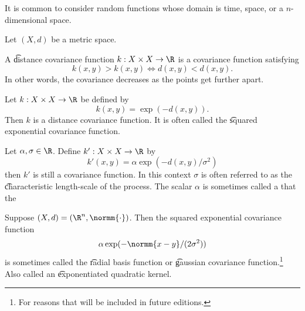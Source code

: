 

It is common to consider random functions whose domain is time, space, or a $n$-dimensional space.


Let $(X, d)$ be a metric space.

A \t{distance covariance function} $k: X \times X \to \R$ is a covariance function satisfying
\[
  k(x, y) > k(x, y) \iff d(x, y) < d(x, y).
\]
In other words, the covariance decreases as the points get further apart.


Let $k: X \times X \to \R$ be defined by
\[
  k(x, y) = \exp(-d(x, y)).
\]
Then $k$ is a distance covariance function.
It is often called the \t{squared exponential covariance function}.

Let $\alpha, \sigma \in \R$.
Define $k': X \times X \to \R$ by
\[
  k'(x, y) = \alpha\exp(-d(x, y)/\sigma^2)
\]
then $k'$ is still a covariance function.
In this context $\sigma$ is often referred to as the \t{characteristic length-scale} of the process.
The scalar $\alpha$ is sometimes called a  that  the 

Suppose $(X, d) = (\R^n, \normm{\cdot})$.
Then the squared exponential covariance function
\[
 \alpha\exp(-\normm{x - y}/(2\sigma^2))
\]
is sometimes called the \t{radial basis function} or \t{gaussian covariance function}.\footnote{For reasons that will be included in future editions.}
Also called an \t{exponentiated quadratic kernel}.
